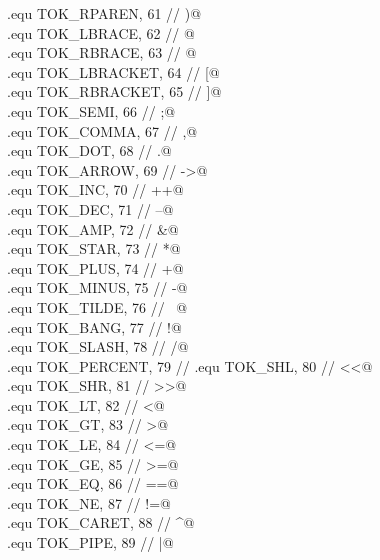 \documentclass[11pt,a4paper,twoside,openright,DIV=15]{scrbook}
\theoremstyle{definition}
\theoremstyle{plain}
\theoremstyle{remark}
\begin{document}
\begin{flushleft}
\begin{minipage}{\linewidth}
\begin{list}{}{}
\mbox{}\verb@.equ TOK_RPAREN,      61      // )@\\
\mbox{}\verb@.equ TOK_LBRACE,      62      // {@\\
\mbox{}\verb@.equ TOK_RBRACE,      63      // }@\\
\mbox{}\verb@.equ TOK_LBRACKET,    64      // [@\\
\mbox{}\verb@.equ TOK_RBRACKET,    65      // ]@\\
\mbox{}\verb@.equ TOK_SEMI,        66      // ;@\\
\mbox{}\verb@.equ TOK_COMMA,       67      // ,@\\
\mbox{}\verb@.equ TOK_DOT,         68      // .@\\
\mbox{}\verb@.equ TOK_ARROW,       69      // ->@\\
\mbox{}\verb@.equ TOK_INC,         70      // ++@\\
\mbox{}\verb@.equ TOK_DEC,         71      // --@\\
\mbox{}\verb@.equ TOK_AMP,         72      // &@\\
\mbox{}\verb@.equ TOK_STAR,        73      // *@\\
\mbox{}\verb@.equ TOK_PLUS,        74      // +@\\
\mbox{}\verb@.equ TOK_MINUS,       75      // -@\\
\mbox{}\verb@.equ TOK_TILDE,       76      // ~@\\
\mbox{}\verb@.equ TOK_BANG,        77      // !@\\
\mbox{}\verb@.equ TOK_SLASH,       78      // /@\\
\mbox{}\verb@.equ TOK_PERCENT,     79      // %@\\
\mbox{}\verb@.equ TOK_SHL,         80      // <<@\\
\mbox{}\verb@.equ TOK_SHR,         81      // >>@\\
\mbox{}\verb@.equ TOK_LT,          82      // <@\\
\mbox{}\verb@.equ TOK_GT,          83      // >@\\
\mbox{}\verb@.equ TOK_LE,          84      // <=@\\
\mbox{}\verb@.equ TOK_GE,          85      // >=@\\
\mbox{}\verb@.equ TOK_EQ,          86      // ==@\\
\mbox{}\verb@.equ TOK_NE,          87      // !=@\\
\mbox{}\verb@.equ TOK_CARET,       88      // ^@\\
\mbox{}\verb@.equ TOK_PIPE,        89      // |@\\

\end{list}
\end{minipage}
\end{flushleft}
\end{document}
